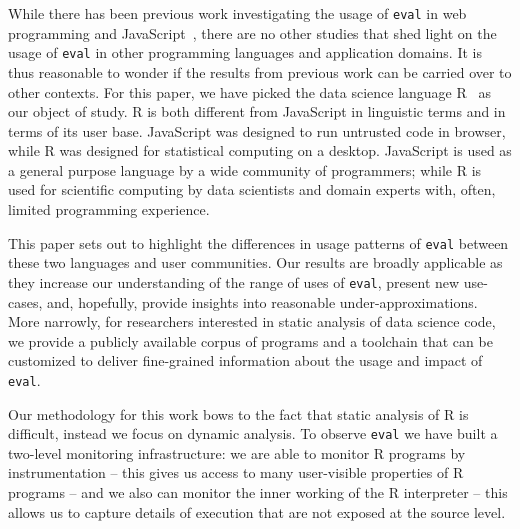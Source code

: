 \documentclass[a4paper,USenglish,cleveref, autoref, thm-restate]{lipics-v2019}
\newcommand{\eval}{\texttt{eval}\xspace}
\begin{document}
While there has been previous work investigating the usage of \eval in web
programming and JavaScript~\cite{ecoop11}, there are no other studies that
shed light on the usage of \eval in other programming languages and
application domains.  It is thus reasonable to wonder if the results from
previous work can be carried over to other contexts. For this paper, we have
picked the data science language R~\cite{r} as our object of study. R is
both different from JavaScript in linguistic terms and in terms of its user
base. JavaScript was designed to run untrusted code in browser, while R was
designed for statistical computing on a desktop. JavaScript is used as a
general purpose language by a wide community of programmers; while R is used
for scientific computing by data scientists and domain experts with, often,
limited programming experience.

This paper sets out to highlight the differences in usage patterns of \eval
between these two languages and user communities. Our results are broadly
applicable as they increase our understanding of the range of uses of \eval,
present new use-cases, and, hopefully, provide insights into reasonable
under-approximations. More narrowly, for researchers interested in static
analysis of data science code, we provide a publicly available corpus of
programs and a toolchain that can be customized to deliver fine-grained
information about the usage and impact of \eval.

Our methodology for this work bows to the fact that static analysis of R is
difficult, instead we focus on dynamic analysis. To observe \eval we have
built a two-level monitoring infrastructure: we are able to monitor R
programs by instrumentation -- this gives us access to many user-visible
properties of R programs -- and we also can monitor the inner working of the
R interpreter -- this allows us to capture details of execution that are not
exposed at the source level.
\end{document}
